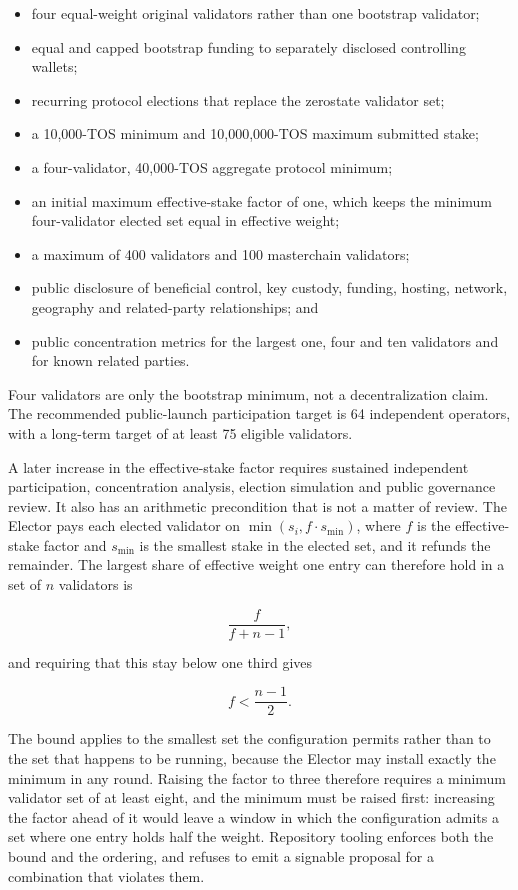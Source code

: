 \documentclass[11pt,oneside]{article}
\begin{document}
\begin{itemize}
  \item four equal-weight original validators rather than one bootstrap validator;
  \item equal and capped bootstrap funding to separately disclosed controlling wallets;
  \item recurring protocol elections that replace the zerostate validator set;
  \item a 10,000-TOS minimum and 10,000,000-TOS maximum submitted stake;
  \item a four-validator, 40,000-TOS aggregate protocol minimum;
  \item an initial maximum effective-stake factor of one, which keeps the minimum
        four-validator elected set equal in effective weight;
  \item a maximum of 400 validators and 100 masterchain validators;
  \item public disclosure of beneficial control, key custody, funding, hosting, network,
        geography and related-party relationships; and
  \item public concentration metrics for the largest one, four and ten validators and for
        known related parties.
\end{itemize}

Four validators are only the bootstrap minimum, not a decentralization claim. The
recommended public-launch participation target is 64 independent operators, with a
long-term target of at least 75 eligible validators.

A later increase in the effective-stake factor requires sustained independent
participation, concentration analysis, election simulation and public governance review. It
also has an arithmetic precondition that is not a matter of review. The Elector pays each
elected validator on $\min(s_i, f \cdot s_{\min})$, where $f$ is the effective-stake factor
and $s_{\min}$ is the smallest stake in the elected set, and it refunds the remainder. The
largest share of effective weight one entry can therefore hold in a set of $n$ validators is

\[
  \frac{f}{f + n - 1},
\]

and requiring that this stay below one third gives

\[
  f < \frac{n - 1}{2}.
\]

The bound applies to the smallest set the configuration permits rather than to the set that
happens to be running, because the Elector may install exactly the minimum in any round.
Raising the factor to three therefore requires a minimum validator set of at least eight,
and the minimum must be raised first: increasing the factor ahead of it would leave a window
in which the configuration admits a set where one entry holds half the weight. Repository
tooling enforces both the bound and the ordering, and refuses to emit a signable proposal
for a combination that violates them.
\end{document}
